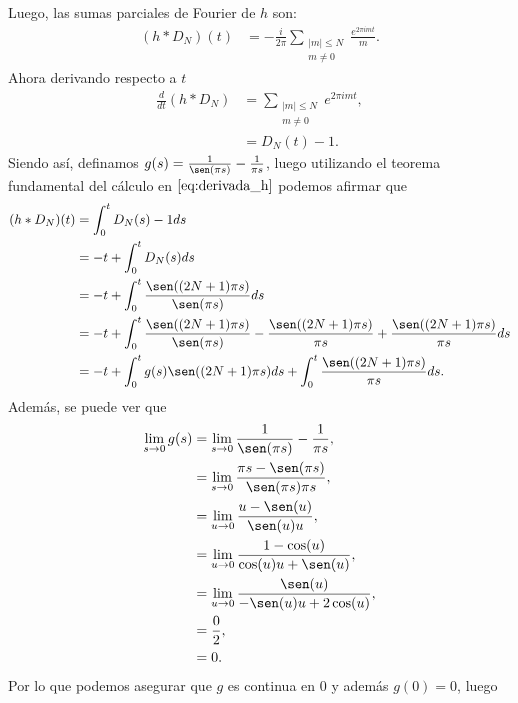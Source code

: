 Luego, las sumas parciales de Fourier de $h$ son:
\begin{equation}\label{eq:serie_h}
  \begin{split}    
    (h*D_{N})(t)&=-\frac{i}{2\pi}\sum_{\substack{|m| \leq N \\ m \neq 0}}\frac{e^{2\pi i mt}}{m}.
  \end{split}
\end{equation}
Ahora derivando respecto a $t$
\begin{equation}\label{eq:derivada_h}
  \begin{split}
    \frac{d}{dt}(h*D_{N})&=\sum_{\substack{|m| \leq N \\ m \neq 0}}e^{2\pi imt},\\
    &=D_{N}(t)-1.    
  \end{split}
\end{equation}
Siendo así, definamos $g(s)=\frac{1}{\sen(\pi s)}-\frac{1}{\pi s}$, luego utilizando el teorema fundamental del cálculo en $\ref{eq:derivada_h}$ podemos afirmar que
\begin{equation}\label{eq:convolucion}
  \begin{split}
    (h*D_{N})(t)&=\int_{0}^{t}D_{N}(s)-1ds\\
    &=-t + \int_{0}^{t}D_{N}(s)ds\\
    &=-t + \int_{0}^{t}\frac{\sen((2N+1)\pi s)}{\sen(\pi s)}ds\\
    &=-t + \int_{0}^{t}\frac{\sen((2N+1)\pi s)}{\sen(\pi s)}-\frac{\sen((2N+1)\pi s)}{\pi s}+\frac{\sen((2N+1)\pi s)}{\pi s}ds\\
    &=-t + \int_{0}^{t}g(s)\sen((2N+1)\pi s)ds +\int_{0}^{t}\frac{\sen((2N+1)\pi s)}{\pi s}ds.
  \end{split}
\end{equation}
Además, se puede ver que
\begin{align*}
  \lim_{s \to 0}g(s)&=\lim_{s \to 0}\frac{1}{\sen(\pi s)}-\frac{1}{\pi s},\\
  &=\lim_{s \to 0}\frac{\pi s-\sen(\pi s)}{\sen(\pi s)\pi s},\\
  &=\lim_{u \to 0}\frac{u-\sen(u)}{\sen(u)u},\\
  &=\lim_{u \to 0}\frac{1-\cos(u)}{\cos(u)u+\sen(u)},\\
  &=\lim_{u \to 0}\frac{\sen(u)}{-\sen(u)u+2\cos(u)},\\
  &=\frac{0}{2},\\
  &=0.
\end{align*}
Por lo que podemos asegurar que $g$ es continua en $0$ y además $g(0)=0$, luego
